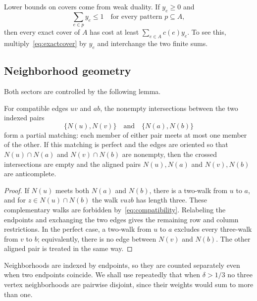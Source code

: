 Lower bounds on covers come from weak duality. If $y_e\ge0$ and
\begin{equation}\label{eq:wholepattern}
 \sum_{e\in p}y_e\le1\quad\text{for every pattern }p\subseteq A,
\end{equation}
then every exact cover of $A$ has cost at least $\sum_{e\in A}c(e)y_e$. To see this, multiply~\eqref{eq:exactcover} by $y_e$ and interchange the two finite sums.

\subsection{Neighborhood geometry}
Both sectors are controlled by the following lemma.
\begin{lemma}\label{lem:cross}
For compatible edges $uv$ and $ab$, the nonempty intersections between the two indexed pairs
\[
 \{N(u),N(v)\}\quad\text{and}\quad\{N(a),N(b)\}
\]
form a partial matching: each member of either pair meets at most one member of the other. If this matching is perfect and the edges are oriented so that $N(u)\cap N(a)$ and $N(v)\cap N(b)$ are nonempty, then the crossed intersections are empty and the aligned pairs $N(u),N(a)$ and $N(v),N(b)$ are anticomplete.
\end{lemma}
\begin{proof}
If $N(u)$ meets both $N(a)$ and $N(b)$, there is a two-walk from $u$ to $a$, and for $z\in N(u)\cap N(b)$ the walk $vuzb$ has length three. These complementary walks are forbidden by~\eqref{eq:compatibility}. Relabeling the endpoints and exchanging the two edges gives the remaining row and column restrictions. In the perfect case, a two-walk from $u$ to $a$ excludes every three-walk from $v$ to $b$; equivalently, there is no edge between $N(v)$ and $N(b)$. The other aligned pair is treated in the same way.
\end{proof}
Neighborhoods are indexed by endpoints, so they are counted separately even when two endpoints coincide. We shall use repeatedly that when $\delta>1/3$ no three vertex neighborhoods are pairwise disjoint, since their weights would sum to more than one.

